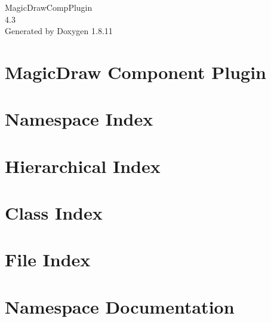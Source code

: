 \documentclass[twoside]{book}
\newcommand{\+}{\discretionary{\mbox{\scriptsize$\hookleftarrow$}}{}{}}
\newcommand{\clearemptydoublepage}{%
  \newpage{\pagestyle{empty}\cleardoublepage}%
}
\begin{document}
\begin{titlepage}
\vspace*{7cm}
\begin{center}%
{\Large Magic\+Draw\+Comp\+Plugin \\[1ex]\large 4.\+3 }\\
\vspace*{1cm}
{\large Generated by Doxygen 1.8.11}\\
\end{center}
\end{titlepage}
\clearemptydoublepage
\tableofcontents
\clearemptydoublepage
{}

\chapter{Magic\+Draw Component Plugin}
\label{index}
\chapter{Namespace Index}

\chapter{Hierarchical Index}

\chapter{Class Index}

\chapter{File Index}

\chapter{Namespace Documentation}





\end{document}
